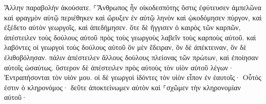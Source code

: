 \documentclass{openreader}
\begin{document}
Ἄλλην παραβολὴν ἀκούσατε. ⸀Ἄνθρωπος ἦν οἰκοδεσπότης ὅστις ἐφύτευσεν ἀμπελῶνα καὶ φραγμὸν αὐτῷ περιέθηκεν καὶ ὤρυξεν ἐν αὐτῷ ληνὸν καὶ ᾠκοδόμησεν πύργον, καὶ ἐξέδετο αὐτὸν γεωργοῖς, καὶ ἀπεδήμησεν. 
ὅτε δὲ ἤγγισεν ὁ καιρὸς τῶν καρπῶν, ἀπέστειλεν τοὺς δούλους αὐτοῦ πρὸς τοὺς γεωργοὺς λαβεῖν τοὺς καρποὺς αὐτοῦ. 
καὶ λαβόντες οἱ γεωργοὶ τοὺς δούλους αὐτοῦ ὃν μὲν ἔδειραν, ὃν δὲ ἀπέκτειναν, ὃν δὲ ἐλιθοβόλησαν. 
πάλιν ἀπέστειλεν ἄλλους δούλους πλείονας τῶν πρώτων, καὶ ἐποίησαν αὐτοῖς ὡσαύτως. 
ὕστερον δὲ ἀπέστειλεν πρὸς αὐτοὺς τὸν υἱὸν αὐτοῦ λέγων· Ἐντραπήσονται τὸν υἱόν μου. 
οἱ δὲ γεωργοὶ ἰδόντες τὸν υἱὸν εἶπον ἐν ἑαυτοῖς· Οὗτός ἐστιν ὁ κληρονόμος· δεῦτε ἀποκτείνωμεν αὐτὸν καὶ ⸀σχῶμεν τὴν κληρονομίαν αὐτοῦ· 
\end{document}
